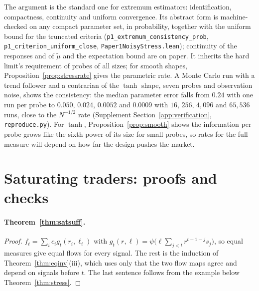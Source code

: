 \documentclass[12pt]{article}
\theoremstyle{definition}
\theoremstyle{remark}
\begin{document}
The argument is the standard one for extremum estimators: identification, compactness, continuity and uniform convergence. Its abstract form is machine-checked on any compact parameter set, in probability, together with the uniform bound for the truncated criteria (\texttt{p1\_extremum\_consistency\_prob}, \texttt{p1\_criterion\_uniform\_close}, \nolinkurl{Paper1NoisyStress.lean}); continuity of the responses and of $\tilde\mu$ and the expectation bound are on paper. It inherits the hard limit's requirement of probes of all sizes; for smooth shapes, Proposition~\ref{prop:stressrate} gives the parametric rate. A Monte Carlo run with a trend follower and a contrarian of the $\tanh$ shape, seven probes and observation noise, shows the consistency: the median parameter error falls from $0.24$ with one run per probe to $0.050$, $0.024$, $0.0052$ and $0.0009$ with $16$, $256$, $4{,}096$ and $65{,}536$ runs, close to the $N^{-1/2}$ rate (Supplement Section~\ref{app:verification}, \nolinkurl{reproduce.py}). For $\tanh$, Proposition~\ref{prop:smooth} shows the information per probe grows like the sixth power of its size for small probes, so rates for the full measure will depend on how far the design pushes the market.

\section{Saturating traders: proofs and checks}\label{app:saturating}

\paragraph{Theorem~\ref{thm:satsuff}.}
\begin{proof}
$f_t=\sum_ic_ig_t(r_i,\ell_i)$ with $g_t(r,\ell)=\psi\bigl(\ell\sum_{j<t}r^{t-1-j}s_j\bigr)$, so equal measures give equal flows for every signal. The rest is the induction of Theorem~\ref{thm:eqinv}(iii), which uses only that the two flow maps agree and depend on signals before $t$. The last sentence follows from the example below Theorem~\ref{thm:stress}.
\end{proof}
\end{document}
